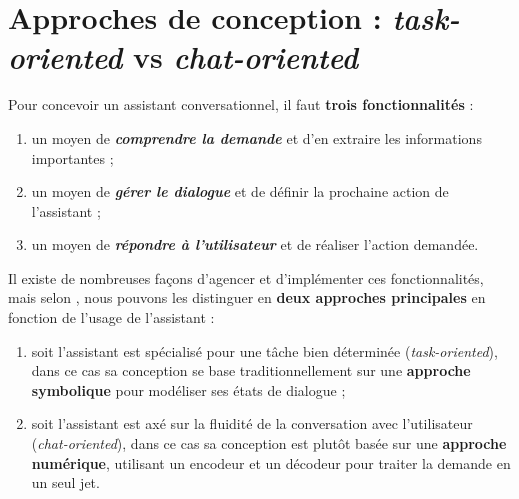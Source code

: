 	
	\section{Approches de conception : \textit{task-oriented} vs \textit{chat-oriented}}
	\label{annex:B.2-ANNEXE-CHATBOTS-APPROCHES}
	
		Pour concevoir un assistant conversationnel, il faut \textbf{trois fonctionnalités} :
		\begin{enumerate}
			\item un moyen de \textcolor{colorCarrotOrange}{\textit{\textbf{comprendre la demande}}} et d'en extraire les informations importantes ;
			\item un moyen de \textcolor{colorDarkPastelGreen}{\textit{\textbf{gérer le dialogue}}} et de définir la prochaine action de l'assistant ;
			\item un moyen de \textcolor{colorSilverLakeBlue}{\textit{\textbf{répondre à l'utilisateur}}} et de réaliser l'action demandée.
		\end{enumerate}
		\vspace{0.5cm}
		
		Il existe de nombreuses façons d'agencer et d'implémenter ces fonctionnalités, mais selon \cite{chen-etal:2017:survey-dialogue-systems}, nous pouvons les distinguer en \textbf{deux approches principales} en fonction de l'usage de l'assistant :
		\begin{enumerate}
			\item soit l'assistant est spécialisé pour une tâche bien déterminée (\textit{task-oriented}), dans ce cas sa conception se base traditionnellement sur une \textbf{approche symbolique} pour modéliser ses états de dialogue ;
			\item soit l'assistant est axé sur la fluidité de la conversation avec l'utilisateur (\textit{chat-oriented}), dans ce cas sa conception est plutôt basée sur une \textbf{approche numérique}, utilisant un encodeur et un décodeur pour traiter la demande en un seul jet.
		\end{enumerate}
		
